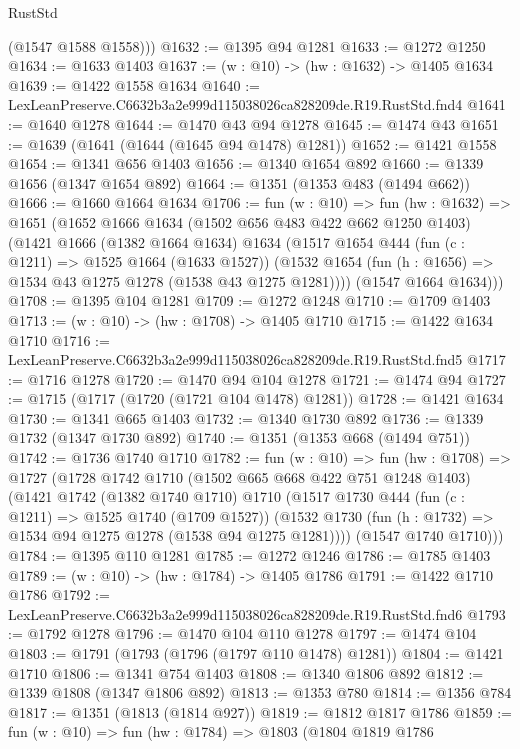 \begin{lexlean}{RustStd}
\begin{coremodule}
        (@1547 @1588 @1558)))
@1632 := @1395 @94 @1281
@1633 := @1272 @1250
@1634 := @1633 @1403
@1637 := (w : @10) -> (hw : @1632) -> @1405 @1634
@1639 := @1422 @1558 @1634
@1640 := LexLeanPreserve.C6632b3a2e999d115038026ca828209de.R19.RustStd.fnd4
@1641 := @1640 @1278
@1644 := @1470 @43 @94 @1278
@1645 := @1474 @43
@1651 := @1639 (@1641 (@1644 (@1645 @94 @1478) @1281))
@1652 := @1421 @1558
@1654 := @1341 @656 @1403
@1656 := @1340 @1654 @892
@1660 := @1339 @1656 (@1347 @1654 @892)
@1664 := @1351 (@1353 @483 (@1494 @662))
@1666 := @1660 @1664 @1634
@1706 := fun (w : @10) =>
  fun (hw : @1632) =>
  @1651
    (@1652
      @1666
      @1634
      (@1502 @656 @483 @422 @662 @1250 @1403)
      (@1421
        @1666
        (@1382 @1664 @1634)
        @1634
        (@1517
          @1654
          @444
          (fun (c : @1211) => @1525 @1664 (@1633 @1527))
          (@1532 @1654 (fun (h : @1656) => @1534 @43 @1275 @1278 (@1538 @43 @1275 @1281))))
        (@1547 @1664 @1634)))
@1708 := @1395 @104 @1281
@1709 := @1272 @1248
@1710 := @1709 @1403
@1713 := (w : @10) -> (hw : @1708) -> @1405 @1710
@1715 := @1422 @1634 @1710
@1716 := LexLeanPreserve.C6632b3a2e999d115038026ca828209de.R19.RustStd.fnd5
@1717 := @1716 @1278
@1720 := @1470 @94 @104 @1278
@1721 := @1474 @94
@1727 := @1715 (@1717 (@1720 (@1721 @104 @1478) @1281))
@1728 := @1421 @1634
@1730 := @1341 @665 @1403
@1732 := @1340 @1730 @892
@1736 := @1339 @1732 (@1347 @1730 @892)
@1740 := @1351 (@1353 @668 (@1494 @751))
@1742 := @1736 @1740 @1710
@1782 := fun (w : @10) =>
  fun (hw : @1708) =>
  @1727
    (@1728
      @1742
      @1710
      (@1502 @665 @668 @422 @751 @1248 @1403)
      (@1421
        @1742
        (@1382 @1740 @1710)
        @1710
        (@1517
          @1730
          @444
          (fun (c : @1211) => @1525 @1740 (@1709 @1527))
          (@1532 @1730 (fun (h : @1732) => @1534 @94 @1275 @1278 (@1538 @94 @1275 @1281))))
        (@1547 @1740 @1710)))
@1784 := @1395 @110 @1281
@1785 := @1272 @1246
@1786 := @1785 @1403
@1789 := (w : @10) -> (hw : @1784) -> @1405 @1786
@1791 := @1422 @1710 @1786
@1792 := LexLeanPreserve.C6632b3a2e999d115038026ca828209de.R19.RustStd.fnd6
@1793 := @1792 @1278
@1796 := @1470 @104 @110 @1278
@1797 := @1474 @104
@1803 := @1791 (@1793 (@1796 (@1797 @110 @1478) @1281))
@1804 := @1421 @1710
@1806 := @1341 @754 @1403
@1808 := @1340 @1806 @892
@1812 := @1339 @1808 (@1347 @1806 @892)
@1813 := @1353 @780
@1814 := @1356 @784
@1817 := @1351 (@1813 (@1814 @927))
@1819 := @1812 @1817 @1786
@1859 := fun (w : @10) =>
  fun (hw : @1784) =>
  @1803
    (@1804
      @1819
      @1786

\end{coremodule}
\end{lexlean}
